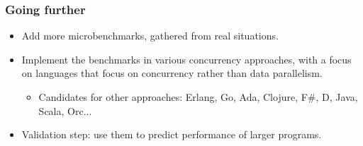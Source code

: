 \documentclass{beamer}
\begin{document}
\begin{frame}
  \frametitle{Going further}
  \begin{itemize}
  \item Add more microbenchmarks, gathered from real situations.
  \item Implement the benchmarks in various concurrency approaches,
    with a focus on languages that focus on concurrency rather than
    data parallelism.
    \begin{itemize}
      \item Candidates for other approaches: Erlang, Go, Ada, Clojure, F\#, D, Java, Scala, Orc...
    \end{itemize}
  \item Validation step: use them to predict performance of larger programs.
  \end{itemize}
\end{frame}
\end{document}
